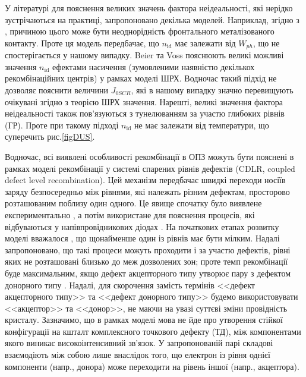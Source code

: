 У літературі для пояснення великих значень фактора неідеальності, які нерідко зустрічаються на практиці,
запропоновано декілька моделей.
Наприклад, згідно з \cite{Heide}, причиною цього може бути неоднорідність фронтального металізованого контакту.
Проте ця модель передбачає, що $n_\mathrm{id}$ має залежати від $W_{ph}$, що не спостерігається у нашому випадку.
Beier та Voss \cite{Beier} пояснюють великі можливі значення $n_\mathrm{id}$ ефектами насичення (зумовленими наявністю декількох
рекомбінаційних центрів) у рамках моделі ШРХ.
Водночас такий підхід не дозволяє пояснити величини $J_{0SCR}$, які в нашому випадку значно перевищують очікувані згідно з теорією ШРХ значення.
Нарешті, великі значення фактора неідеальності також пов'язуються з тунелюванням за участю глибоких рівнів (ГР)\cite{Shah,Kaminski_n}.
Проте при такому підході $n_\mathrm{id}$ не має залежати
від температури, що суперечить рис.\ref{figDUS}.

Водночас, всі виявлені особливості рекомбінації в ОПЗ можуть бути пояснені в рамках
моделі рекомбінації у системі спарених рівнів дефектів (CDLR, coupled defect level recombination).
Цей механізм передбачає швидкі переходи носіїв заряду безпосередньо між рівнями, які належать різним дефектам,
просторово розташованим поблизу один одного.
Це явище спочатку було виявлене експериментально \cite{DAPR:Chen1991,DAPR:Chen1994},
а потім використане для пояснення процесів, які відбуваються у напівпровідникових діодах \cite{CDLR:JAP1995,CDLR:JAP,CDLR:SSP,Breitenstein2013,CDLR:SupMicr}.
На початкових етапах розвитку моделі вважалося \cite{CDLR:JAP1995}, що щонайменше один із рівнів має бути
мілким.
Надалі запропоновано, що такі процеси можуть проходити і за участю дефектів, рівні яких не розташовані близько до меж дозволених зон;
проте темп рекомбінації буде максимальним, якщо дефект акцепторного типу утворює пару з дефектом донорного типу \cite{CDLR:JAP}.
Надалі, для скорочення замість термінів <<дефект акцепторного типу>> та <<дефект донорного типу>>
будемо використовувати <<акцептор>> та <<донор>>, не маючи на увазі суттєві зміни провідність кристалу.
Зазначимо, що в рамках моделі мова не йде про утворення стійкої конфігурації на кшталт комплексного точкового дефекту (ТД),
між компонентами якого виникає високоінтенсивний зв'язок.
У запропонованій парі
складові взаємодіють
між собою лише внаслідок того, що електрон із рівня однієї компоненти (напр., донора) може переходити на рівень іншої (напр., акцептора).

